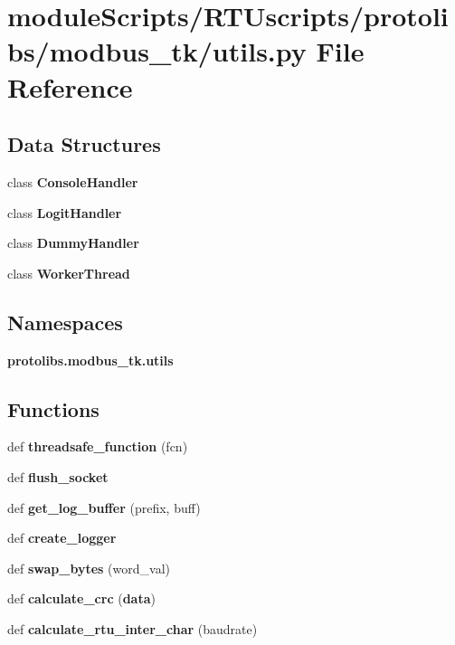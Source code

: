 \section{module\+Scripts/\+R\+T\+Uscripts/protolibs/modbus\+\_\+tk/utils.py File Reference}
\label{modbus__tk_2utils_8py}
\subsection*{Data Structures}
\begin{DoxyCompactItemize}
\item 
class {\bf Console\+Handler}
\item 
class {\bf Logit\+Handler}
\item 
class {\bf Dummy\+Handler}
\item 
class {\bf Worker\+Thread}
\end{DoxyCompactItemize}
\subsection*{Namespaces}
\begin{DoxyCompactItemize}
\item 
 {\bf protolibs.\+modbus\+\_\+tk.\+utils}
\end{DoxyCompactItemize}
\subsection*{Functions}
\begin{DoxyCompactItemize}
\item 
def {\bf threadsafe\+\_\+function} (fcn)
\item 
def {\bf flush\+\_\+socket}
\item 
def {\bf get\+\_\+log\+\_\+buffer} (prefix, buff)
\item 
def {\bf create\+\_\+logger}
\item 
def {\bf swap\+\_\+bytes} (word\+\_\+val)
\item 
def {\bf calculate\+\_\+crc} ({\bf data})
\item 
def {\bf calculate\+\_\+rtu\+\_\+inter\+\_\+char} (baudrate)
\end{DoxyCompactItemize}

